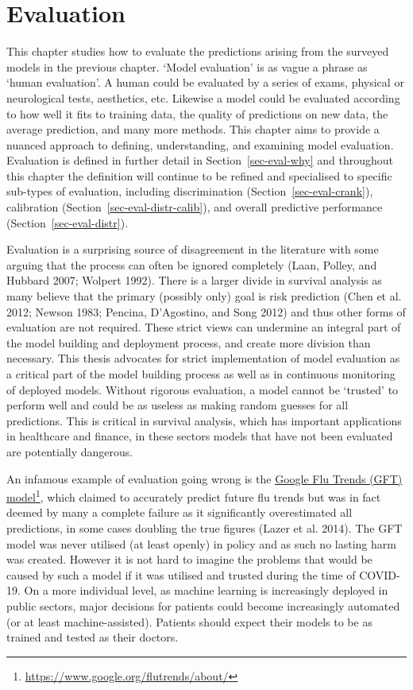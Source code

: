 \documentclass[
  letterpaper,
]{scrbook}
\theoremstyle{plain}
\theoremstyle{definition}
\theoremstyle{remark}
\begin{document}

\hypertarget{evaluation}{%
\chapter{Evaluation}\label{evaluation}}

This chapter studies how to evaluate the predictions arising from the
surveyed models in the previous chapter. `Model evaluation' is as vague
a phrase as `human evaluation'. A human could be evaluated by a series
of exams, physical or neurological tests, aesthetics, etc. Likewise a
model could be evaluated according to how well it fits to training data,
the quality of predictions on new data, the average prediction, and many
more methods. This chapter aims to provide a nuanced approach to
defining, understanding, and examining model evaluation. Evaluation is
defined in further detail in Section~\ref{sec-eval-why} and throughout
this chapter the definition will continue to be refined and specialised
to specific sub-types of evaluation, including discrimination
(Section~\ref{sec-eval-crank}), calibration
(Section~\ref{sec-eval-distr-calib}), and overall predictive performance
(Section~\ref{sec-eval-distr}).

Evaluation is a surprising source of disagreement in the literature with
some arguing that the process can often be ignored completely (Laan,
Polley, and Hubbard 2007; Wolpert 1992). There is a larger divide in
survival analysis as many believe that the primary (possibly only) goal
is risk prediction (Chen et al. 2012; Newson 1983; Pencina, D'Agostino,
and Song 2012) and thus other forms of evaluation are not required.
These strict views can undermine an integral part of the model building
and deployment process, and create more division than necessary. This
thesis advocates for strict implementation of model evaluation as a
critical part of the model building process as well as in continuous
monitoring of deployed models. Without rigorous evaluation, a model
cannot be `trusted' to perform well and could be as useless as making
random guesses for all predictions. This is critical in survival
analysis, which has important applications in healthcare and finance, in
these sectors models that have not been evaluated are potentially
dangerous.

An infamous example of evaluation going wrong is the
\href{https://www.google.org/flutrends/about/}{Google Flu Trends (GFT)
model}\footnote{\url{https://www.google.org/flutrends/about/}}, which
claimed to accurately predict future flu trends but was in fact deemed
by many a complete failure as it significantly overestimated all
predictions, in some cases doubling the true figures (Lazer et al.
2014). The GFT model was never utilised (at least openly) in policy and
as such no lasting harm was created. However it is not hard to imagine
the problems that would be caused by such a model if it was utilised and
trusted during the time of COVID-19. On a more individual level, as
machine learning is increasingly deployed in public sectors, major
decisions for patients could become increasingly automated (or at least
machine-assisted). Patients should expect their models to be as trained
and tested as their doctors.
\end{document}
